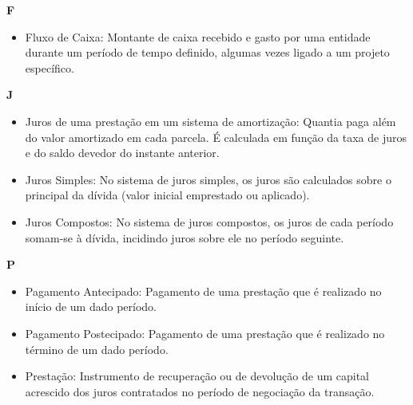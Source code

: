 \textbf{F}
\begin{itemize}
 \item Fluxo de Caixa:
    Montante de caixa recebido e gasto por uma entidade durante um período de tempo definido, algumas vezes ligado a um projeto específico. 
\end{itemize}

\textbf{J}
\begin{itemize}
 \item Juros de uma prestação em um sistema de amortização:
    Quantia paga além do valor amortizado em cada parcela. É calculada em função da taxa de juros e do saldo devedor do instante anterior. 

\item Juros Simples:
    No sistema de juros simples, os juros são calculados sobre o principal da dívida (valor inicial emprestado ou aplicado).

\item Juros Compostos:
    No sistema de juros compostos, os juros de cada período somam-se à dívida, incidindo juros sobre ele no período seguinte.
\end{itemize}

\textbf{P}
\begin{itemize}
 \item Pagamento Antecipado:
Pagamento de uma prestação que é realizado no início de um dado período.

\item Pagamento Postecipado:
Pagamento de uma prestação que é realizado no término de um dado período.

\item Prestação:
    Instrumento de recuperação ou de devolução de um capital acrescido dos juros contratados no período de negociação da transação. 
\end{itemize}

